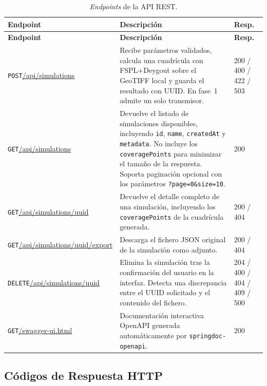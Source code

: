 \begingroup
\small
\begin{longtable}{|p{5cm}|p{6cm}|p{2cm}|}
\caption{\textit{Endpoints} de la API REST.}
\label{tab:endpoints}\\
\hline
\textbf{Endpoint} & \textbf{Descripción} & \textbf{Resp.} \\
\hline
\endfirsthead
\hline
\textbf{Endpoint} & \textbf{Descripción} & \textbf{Resp.} \\
\hline
\endhead
\texttt{POST}\newline\url{/api/simulations} &
  Recibe parámetros validados, calcula una cuadrícula con FSPL+Deygout sobre el GeoTIFF
  local y guarda el resultado con UUID. En fase~1 admite un solo transmisor. & 200 / 400 / 422 / 503 \\
\hline
\texttt{GET}\newline\url{/api/simulations} &
  Devuelve el listado de simulaciones disponibles, incluyendo \texttt{id},
  \texttt{name}, \texttt{createdAt} y \texttt{metadata}. No incluye los
  \texttt{coveragePoints} para minimizar el tamaño de la respuesta. Soporta
  paginación opcional con los parámetros \texttt{?page=0\&size=10}. & 200 \\
\hline
\texttt{GET}\newline\url{/api/simulations/uuid} &
  Devuelve el detalle completo de una simulación, incluyendo los
  \texttt{coveragePoints} de la cuadrícula generada. & 200 / 404 \\
\hline
\texttt{GET}\newline\url{/api/simulations/uuid/export} &
  Descarga el fichero JSON original de la simulación como adjunto. & 200 / 404 \\
\hline
\texttt{DELETE}\newline\url{/api/simulations/uuid} &
  Elimina la simulación tras la confirmación del usuario en la interfaz. Detecta una
  discrepancia entre el UUID solicitado y el contenido del fichero. & 204 / 400 / 404 / 409 / 500 \\
\hline
\texttt{GET}\newline\url{/swagger-ui.html} &
  Documentación interactiva OpenAPI generada automáticamente por
  \texttt{springdoc-openapi}. & 200 \\
\hline
\end{longtable}
\endgroup

\subsection{Códigos de Respuesta HTTP}
\label{subsec:http_codes}

